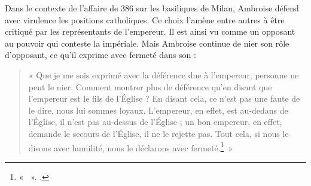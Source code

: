 \bigskip

Dans le contexte de l'affaire de 386 sur les basiliques de Milan, Ambroise défend avec virulence les positions catholiques. Ce choix l'amène entre autres à être critiqué par les représentants de l'empereur. Il est ainsi vu comme un opposant au pouvoir qui conteste la  impériale. Mais Ambroise continue de nier son rôle d'opposant, ce qu'il exprime avec fermeté dans son  :

\bigskip

\begin{quote}
    « Que je me sois exprimé avec la déférence due à l'empereur, personne ne peut le nier. Comment montrer plus de déférence qu'en disant que l'empereur est le fils de l'Église ? En disant cela, ce n'est pas une faute de le dire, nous lui sommes loyaux. L'empereur, en effet, est au-dedans de l'Église, il n'est pas au-dessus de l'Église ; un bon empereur, en effet, demande le secours de l'Église, il ne le rejette pas. Tout cela, si nous le disons avec humilité, nous le déclarons avec fermeté.\footnote{« ~». \cite[\nopp 75A, 36]{ambroise_lettres}.}~»
\end{quote}

\bigskip

